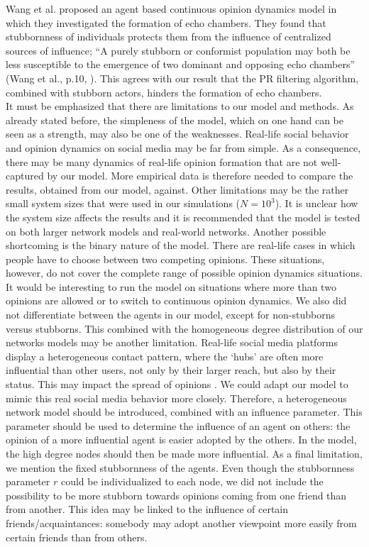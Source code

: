 \documentclass[11 pt , letterpaper , twoside , openright]{book}
\begin{document}
\newline
Wang et al. \cite{Wang2020} proposed an agent based continuous opinion dynamics model in which they investigated the formation of echo chambers. They found that stubbornness of individuals protects them from the
influence of centralized sources of influence; ``A purely stubborn or conformist
population may both be less susceptible to the emergence of
two dominant and opposing echo chambers'' (Wang et al., p.10, \cite{Wang2020}). This agrees with our result that the PR filtering algorithm, combined with stubborn actors, hinders the formation of echo chambers.\\
\newline
It must be emphasized that there are limitations to our model and methods. As already stated before, the simpleness of the model, which on one hand can be seen as a strength, may also be one of the weaknesses. Real-life social behavior and opinion dynamics on social media may be far from simple. As a consequence, there may be many dynamics of real-life opinion formation that are not well-captured by our model. More empirical data is therefore needed to compare the results, obtained from our model, against. Other limitations may be the rather small system sizes that were used in our simulations ($N = 10^3$). It is unclear how the system size affects the results and it is recommended that the model is tested on both larger network models and real-world networks. Another possible shortcoming is the binary nature of the model. There are real-life cases in which people have to choose between two competing opinions. These situations, however, do not cover the complete range of possible opinion dynamics situations. It would be interesting to run the model on situations where more than two opinions are allowed or to switch to continuous opinion dynamics. We also did not differentiate between the agents in our model, except for non-stubborns versus stubborns. This combined with the homogeneous degree distribution of our networks models may be another limitation. Real-life social media platforms display a heterogeneous contact pattern, where the `hubs' are often more influential than other users, not only by their larger reach, but also by their status. This may impact the spread of opinions \cite{Fan2020}\cite{Wang2019}. We could adapt our model to mimic this real social media behavior more closely. Therefore, a heterogeneous network model should be introduced, combined with an influence parameter. This parameter should be used to determine the influence of an agent on others: the opinion of a more influential agent is easier adopted by the others. In the model, the high degree nodes should then be made more influential. As a final limitation, we mention the fixed stubbornness of the agents. Even though the stubbornness parameter $r$ could be individualized to each node, we did not include the possibility to be more stubborn towards opinions coming from one friend than from another. This idea may be linked to the influence of certain friends/acquaintances: somebody may adopt another viewpoint more easily from certain friends than from others.\\
\end{document}

